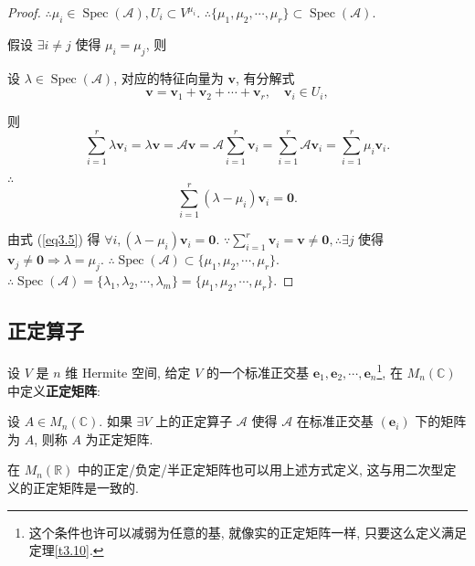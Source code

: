 \documentclass[color=black,device=normal,lang=cn,mode=geye]{elegantnote}
\begin{document}
\begin{proof}
    $\therefore\mu_i\in\operatorname{Spec}(\mathcal{A}),U_i\subset V^{\mu_i}$. $\therefore\{\mu_1,\mu_2,\cdots,\mu_r\}\subset\operatorname{Spec}(\mathcal{A})$.

    假设 $\exists i\neq j$ 使得 $\mu_i=\mu_j$, 则 

    设 $\lambda\in\operatorname{Spec}(\mathcal{A})$, 对应的特征向量为 $\boldsymbol{v}$, 有分解式
    \[\boldsymbol{v}=\boldsymbol{v}_1+\boldsymbol{v}_2+\cdots+\boldsymbol{v}_r,\quad\boldsymbol{v}_i\in U_i,\]

    则
    \[\sum\limits_{i=1}^r\lambda\boldsymbol{v}_i=\lambda\boldsymbol{v}=\mathcal{A}\boldsymbol{v}=\mathcal{A}\sum\limits_{i=1}^r\boldsymbol{v}_i=\sum\limits_{i=1}^r\mathcal{A}\boldsymbol{v}_i=\sum\limits_{i=1}^r\mu_i\boldsymbol{v}_i.\]

    $\therefore$
    \[\sum\limits_{i=1}^r(\lambda-\mu_i)\boldsymbol{v}_i=\boldsymbol{0}.\]

    由式 (\ref{eq3.5}) 得 $\forall i,(\lambda-\mu_i)\boldsymbol{v}_i=\boldsymbol{0}$. $\because\sum\limits_{i=1}^r\boldsymbol{v}_i=\boldsymbol{v}\neq\boldsymbol{0},\therefore\exists j$ 使得 $\boldsymbol{v}_j\neq\boldsymbol{0}\Rightarrow\lambda=\mu_j$. $\therefore\operatorname{Spec}(\mathcal{A})\subset\{\mu_1,\mu_2,\cdots,\mu_r\}$. $\therefore\operatorname{Spec}(\mathcal{A})=\{\lambda_1,\lambda_2,\cdots,\lambda_m\}=\{\mu_1,\mu_2,\cdots,\mu_r\}$.

\end{proof}
\subsection{正定算子}
设 $V$ 是 $n$ 维 Hermite 空间, 给定 $V$ 的一个标准正交基 $\boldsymbol{e}_1,\boldsymbol{e}_2,\cdots,\boldsymbol{e}_n$\footnote{这个条件也许可以减弱为任意的基, 就像实的正定矩阵一样, 只要这么定义满足定理\ref{t3.10}.}, 在 $M_n(\mathbb{C})$ 中定义\textbf{正定矩阵}:
\begin{definition}\label{d3.2}
    设 $A\in M_n(\mathbb{C})$. 如果 $\exists V$ 上的正定算子 $\mathcal{A}$ 使得 $\mathcal{A}$ 在标准正交基 $(\boldsymbol{e}_i)$ 下的矩阵为 $A$, 则称 $A$ 为正定矩阵.
\end{definition}
在 $M_n(\mathbb{R})$ 中的正定/负定/半正定矩阵也可以用上述方式定义, 这与用二次型定义的正定矩阵是一致的.
\end{document}
